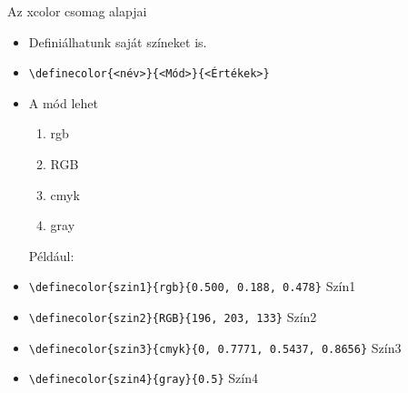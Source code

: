 \documentclass[aspectratio=1610, dvipsnames, xcolor=table]{beamer}
\begin{document}
    \begin{frame}[fragile]{Az xcolor csomag alapjai}
        \begin{minipage}{0.8\textwidth}
            \begin{itemize}
                \item {}Definiálhatunk saját színeket is.
                \item {}\verb!\definecolor{<név>}{<Mód>}{<Értékek>}!
                \item {}A mód lehet
                \begin{enumerate}
                    \item {}rgb
                    \item {}RGB
                    \item {}cmyk
                    \item {}gray    
                \end{enumerate}
                Például:
                \item {}\verb!\definecolor{szin1}{rgb}{0.500, 0.188, 0.478}! \hfill \textcolor{szin1}{Szín1}
                \item {}\verb!\definecolor{szin2}{RGB}{196, 203, 133}! \hfill \textcolor{szin2}{Szín2}
                \item {}\verb!\definecolor{szin3}{cmyk}{0, 0.7771, 0.5437, 0.8656}! \hfill \textcolor{szin3}{Szín3}
                \item {}\verb!\definecolor{szin4}{gray}{0.5}! \hfill \textcolor{szin4}{Szín4}
            \end{itemize}                                                        
        \end{minipage} 
    \end{frame}
    
\end{document}
